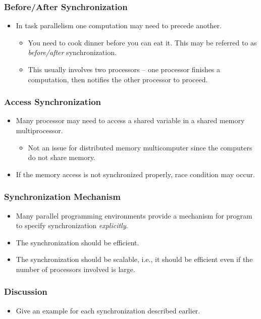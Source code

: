 \documentclass{beamer}
\begin{document}
\begin{CJK}{UTF8}{bsmi}
\begin{frame}
\frametitle{Before/After Synchronization}
\begin{itemize}
\item In task parallelism one computation may need to precede another.
\begin{itemize}
\item You need to cook dinner before you can eat it.  This may be
  referred to as {\em before/after} synchronization.
\item This usually involves two processors -- one processor finishes a
  computation, then notifies the other processor to proceed.
\end{itemize}
\end{itemize}
\end{frame}

\begin{frame}
\frametitle{Access Synchronization}
\begin{itemize}
\item Many processor may need to access a shared variable in a shared
  memory multiprocessor.
\begin{itemize}
\item Not an issue for distributed memory multicomputer since the
  computers do not share memory.
\end{itemize}
\item If the memory access is not synchronized properly, race
  condition may occur.
\end{itemize}
\end{frame}


\begin{frame}
\frametitle{Synchronization Mechanism}
\begin{itemize}
\item Many parallel programming environments provide a mechanism for
  program to specify synchronization {\em explicitly}.
\item The synchronization should be efficient.
\item The synchronization should be scalable, i.e., it should be
  efficient even if the number of processors involved is large.
\end{itemize}
\end{frame}

\begin{frame}
\frametitle{Discussion}
\begin{itemize}
\item Give an example for each synchronization described earlier.
\end{itemize}
\end{frame}


\end{CJK}
\end{document}
